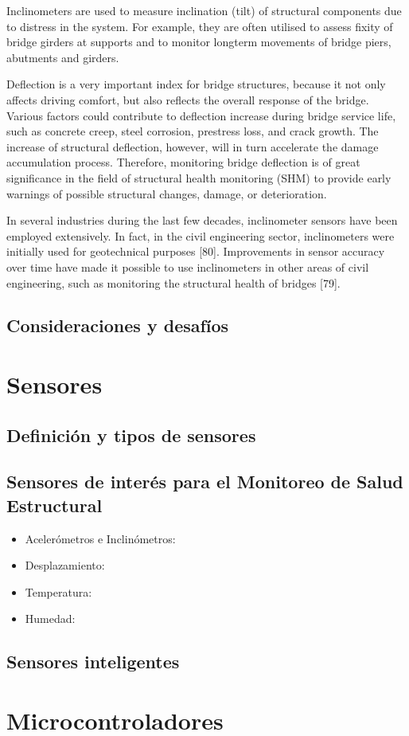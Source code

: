 \begin{itemize}
        Inclinometers are used to measure inclination (tilt) of structural components due to distress in the system. For example, they are often utilised to assess fixity of bridge girders at supports and to monitor longterm movements of bridge piers, abutments and girders.

        Deflection is a very important index for bridge structures, because it not only affects driving comfort, but also reflects the overall response of the bridge. Various factors could contribute to deflection increase during bridge service life, such as concrete creep, steel corrosion, prestress loss, and crack growth. The increase of structural deflection, however, will in turn accelerate the damage accumulation process. Therefore, monitoring bridge deflection is of great significance in the field of structural health monitoring (SHM) to provide early warnings of possible structural changes, damage, or deterioration.

        In several industries during the last few decades, inclinometer sensors have been employed extensively. In fact, in the civil engineering sector, inclinometers were initially used for geotechnical purposes [80]. Improvements in sensor accuracy over time have made it possible to use inclinometers in other areas of civil engineering, such as monitoring the structural health of bridges [79].
        


    \end{itemize}
    

\subsection{Consideraciones y desafíos}

\section{Sensores}

\subsection{Definición y tipos de sensores}

\subsection{Sensores de interés para el Monitoreo de Salud Estructural}

    \begin{itemize}
        \item Acelerómetros e Inclinómetros:
        \item Desplazamiento:
        \item Temperatura:
        \item Humedad:
    \end{itemize}

\subsection{Sensores inteligentes}

\section{Microcontroladores}